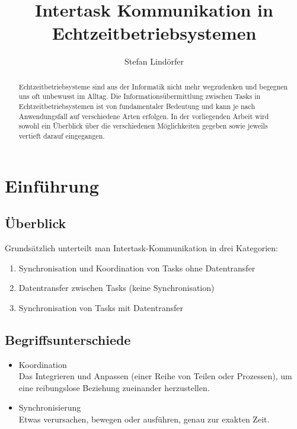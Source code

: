 \documentclass{llncs}
\begin{document}
\title{Intertask Kommunikation in Echtzeitbetriebsystemen}
\author{Stefan Lindörfer}


\maketitle

\renewcommand{\abstractname}{Abstract}

\begin{abstract}
	Echtzeitbetriebsysteme sind aus der Informatik nicht mehr wegzudenken und begegnen uns oft unbewusst im Alltag. 
	Die Informationsübermittlung zwischen Tasks in Echtzeitbetriebsystemen ist von fundamentaler Bedeutung und kann je nach Anwendungsfall auf verschiedene Arten erfolgen. In der vorliegenden Arbeit wird sowohl ein Überblick über die verschiedenen Möglichkeiten gegeben sowie jeweils vertieft darauf eingegangen.
\end{abstract}

\section{Einführung}

\subsection{Überblick}
Grundsätzlich unterteilt man Intertask-Kommunikation in drei Kategorien:
\begin{enumerate}
	\item Synchronisation und Koordination von Tasks ohne Datentransfer
	\item Datentransfer zwischen Tasks (keine Synchronisation)
	\item Synchronisation von Tasks mit Datentransfer
\end{enumerate}
\subsection{Begriffsunterschiede}
\begin{itemize}
	\item Koordination\\Das Integrieren und Anpassen (einer Reihe von Teilen oder Prozessen), um eine reibungslose Beziehung zueinander herzustellen.
	\item Synchronisierung\\Etwas verursachen, bewegen oder ausführen, genau zur exakten Zeit.
\end{itemize}
\end{document}
